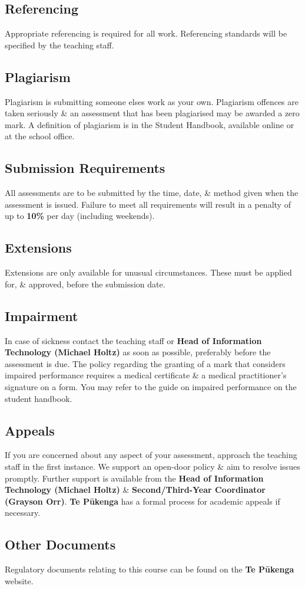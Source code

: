 \documentclass{article}
\begin{document}
\subsection*{Referencing}
Appropriate referencing is required for all work. Referencing standards will be specified by the teaching staff.

\subsection*{Plagiarism}
Plagiarism is submitting someone elses work as your own. Plagiarism offences are taken seriously \& an assessment that has been plagiarised may be awarded a zero mark. A definition of plagiarism is in the Student Handbook, available online or at the school office.

\subsection*{Submission Requirements}
All assessments are to be submitted by the time, date, \& method given when the assessment is issued. Failure to meet all requirements will result in a penalty of up to \textbf{10\%} per day (including weekends).

\subsection*{Extensions}
Extensions are only available for unusual circumstances. These must be applied for, \& approved, before the submission date.

\subsection*{Impairment}
In case of sickness contact the teaching staff or \textbf{Head of Information Technology (Michael Holtz)} as soon as possible, preferably before the assessment is due. The policy regarding the granting of a mark that considers impaired performance requires a medical certificate \& a medical practitioner’s signature on a form. You may refer to the guide on impaired performance on the student handbook.

\subsection*{Appeals}
If you are concerned about any aspect of your assessment, approach the teaching staff in the first instance. We support an open-door policy \& aim to resolve issues promptly. Further support is available from the \textbf{Head of Information Technology (Michael Holtz)} \& \textbf{Second/Third-Year Coordinator (Grayson Orr)}. \textbf{Te Pūkenga} has a formal process for academic appeals if necessary.

\subsection*{Other Documents}
Regulatory documents relating to this course can be found on the \textbf{Te Pūkenga} website.
\end{document}

